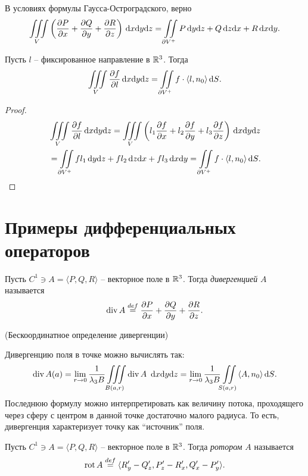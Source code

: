 \begin{corollary}
    В условиях формулы Гаусса-Остроградского, верно
\[
    \iiint\limits_{V}{\left(\dfrac{\partial P}{\partial x} + \dfrac{\partial Q}{\partial y} + \dfrac{\partial R}{\partial z}\right) \,\mathrm{d} x \mathrm{d} y \mathrm{d} z} =
    \iint\limits_{\partial V^+}{P \,\mathrm{d} y \mathrm{d} z + Q \,\mathrm{d} z \mathrm{d} x + R \,\mathrm{d} x \mathrm{d} y}
.\]
\end{corollary}

\begin{corollary}
    Пусть $l$ -- фиксированное направление в $\mathbb{R}^3$. Тогда
\[
    \iiint\limits_{V}{\dfrac{\partial f}{\partial l} \,\mathrm{d} x \mathrm{d} y \mathrm{d} z} = 
    \iint\limits_{\partial V^+}{f \cdot \langle l, n_0 \rangle \,\mathrm{d} S}
.\] 
\end{corollary}
\begin{proof}
    \begin{align*}
        &\iiint\limits_V{\dfrac{\partial f}{\partial l} \,\mathrm{d} x \mathrm{d} y \mathrm{d} z} =
        \iiint\limits_V{\left( l_1 \dfrac{\partial f}{\partial x} + l_2 \dfrac{\partial f}{\partial y} + l_3 \dfrac{\partial f}{\partial z} \right) \,\mathrm{d} x \mathrm{d} y \mathrm{d} z} \\
        &= \iint\limits_{\partial V^+}{f l_1 \,\mathrm{d} y \mathrm{d} z + f l_2 \,\mathrm{d} z \mathrm{d} x + f l_3 \,\mathrm{d} x \mathrm{d} y}
        = \iint\limits_{\partial V^+}{f \cdot \langle l, n_0 \rangle \,\mathrm{d} S}
    .\end{align*}
\end{proof}

\section{Примеры дифференциальных операторов}

\begin{definition}
    Пусть $C^1 \ni A = \langle P, Q, R \rangle$ -- векторное поле в $\mathbb{R}^3$. Тогда
    \textit{дивергенцией} $A$ называется
\[
    \operatorname{div} A \overset{def}{\underset{}{=}} \dfrac{\partial P}{\partial x} + \dfrac{\partial Q}{\partial y} + \dfrac{\partial R}{\partial z}
.\] 
\end{definition}

\begin{remark}(Бескоординатное определение дивергенции)

    Дивергенцию поля в точке можно вычислять так:
\[
    \operatorname{div} A(a) = \lim_{r \to 0}{\frac{1}{\lambda_3 B} \iiint\limits_{B(a, r)}{\operatorname{div} A~ \,\mathrm{d} x \mathrm{d} y \mathrm{d} z}} =
    \lim_{r \to 0}{\frac{1}{\lambda_3 B} \iint\limits_{S(a, r)}{\langle A, n_0 \rangle} \,\mathrm{d} S}
.\] 
    Последнюю формулу можно интерпретировать как величину потока, проходящего через
    сферу с центром в данной точке достаточно малого радиуса. То есть, дивергенция
    характеризует точку как ``источник'' поля.
\end{remark}

\begin{definition}
    Пусть $C^1 \ni A = \langle P, Q, R \rangle$ -- векторное поле в $\mathbb{R}^3$. Тогда
    \textit{ротором} $A$ называется
\[
    \operatorname{rot} A \overset{def}{\underset{}{=}} \langle R'_y - Q'_z, P'_z - R'_x, Q'_x - P'_y \rangle
.\] 
\end{definition}

